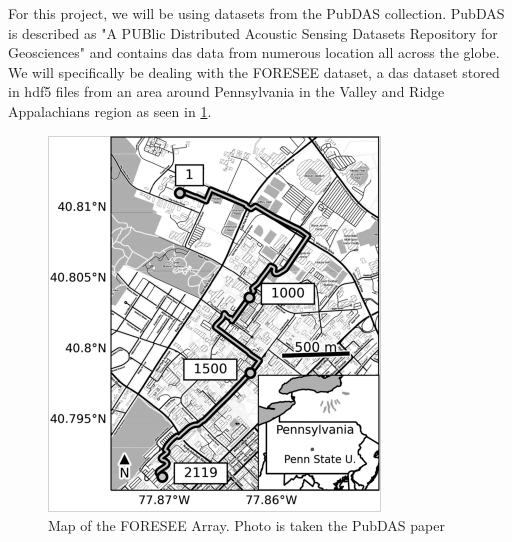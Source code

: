 For this project, we will be using datasets from the PubDAS \cite{spica2023pubdas} collection. PubDAS is described as "A PUBlic Distributed Acoustic Sensing Datasets Repository for Geosciences" and contains \acrshort{das} data from numerous location all across the globe. We will specifically be dealing with the FORESEE dataset, a \acrshort{das} dataset stored in \acrshort{hdf5} files from an area around Pennsylvania in the Valley and Ridge Appalachians region  as seen in \ref{fig:foresee}. \\

\begin{figure}[!h]
    \centering
    \includegraphics[width=0.5\linewidth]{figures/foresee.png}
    \caption{Map of the FORESEE Array. Photo is taken the PubDAS paper \cite{spica2023pubdas}}
    \label{fig:foresee}
\end{figure}

